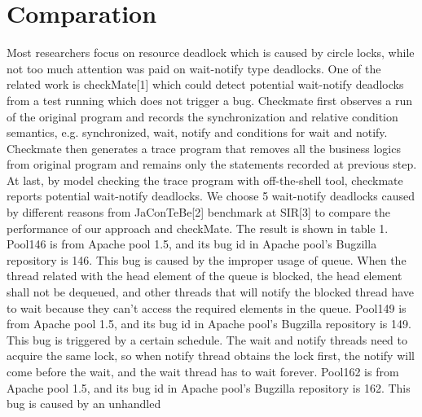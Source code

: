 \documentclass{article}
\begin{document}
\section{Comparation}
Most researchers focus on resource deadlock which is caused by circle locks, while not too much attention was paid on wait-notify type deadlocks. One of the related work is checkMate[1] which could detect potential wait-notify deadlocks from a test running which does not trigger a bug. Checkmate first observes a run of the original program and records the synchronization and relative condition semantics, e.g. synchronized, wait, notify and conditions for wait and notify. Checkmate then generates a trace program that removes all the business logics from original program and remains only the statements recorded at previous step. At last, by model checking the trace program with off-the-shell tool, checkmate reports potential wait-notify deadlocks.
We choose 5 wait-notify deadlocks caused by different reasons from JaConTeBe[2] benchmark at SIR[3] to compare the performance of our approach and checkMate. The result is shown in table 1.
Pool146 is from Apache pool 1.5, and its bug id in Apache pool’s Bugzilla repository is 146. This bug is caused by the improper usage of queue. When the thread related with the head element of the queue is blocked, the head element shall not be dequeued, and other threads that will notify the blocked thread have to wait because they can’t access the required elements in the queue.
Pool149 is from Apache pool 1.5, and its bug id in Apache pool’s Bugzilla repository is 149. This bug is triggered by a certain schedule. The wait and notify threads need to acquire the same lock, so when notify thread obtains the lock first, the notify will come before the wait, and the wait thread has to wait forever.
Pool162 is from Apache pool 1.5, and its bug id in Apache pool’s Bugzilla repository is 162. This bug is caused by an unhandled
\end{document}
